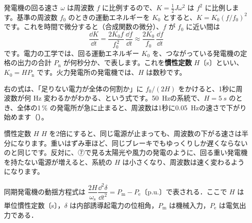 発電機の回る速さ $\omega$ は周波数 $f$ に比例するので、$K=\tfrac12J\omega^2$ は $f^2$ に比例します。基準の周波数 $f_0$ のときの運動エネルギーを $K_0$ とすると、$K=K_0(f/f_0)^2$ です。これを時間で微分すると（合成関数の微分）、$f$ が $f_0$ に近い間は
\[\frac{\dd K}{\dd t}=\frac{2K_0f}{f_0^{\,2}}\,\frac{\dd f}{\dd t}\approx\frac{2K_0}{f_0}\,\frac{\dd f}{\dd t}\]
です。電力の工学では、回る運動エネルギー $K_0$ を、つながっている発電機の定格の出力の合計 $P_{\mathrm n}$ が何秒分か、で表します。これを\textbf{慣性定数} $H$〔s〕といい、$K_0=HP_{\mathrm n}$ です。火力発電所の発電機では、$H$ は数秒です。
\begin{phflow}[周波数の下がる速さ]
\end{phflow}
右の式は、「足りない電力が全体の何割か」に $f_0/(2H)$ をかけると、1秒に周波数が何 Hz 変わるかがわかる、という式です。\qty{50}{Hz}の系統で、$H=\qty{5}{s}$ のとき、全体の1\,\% の発電所が急に止まると、周波数は1秒に\qty{0.05}{Hz}の速さで下がり始めます（）。
\begin{phbaisuru}{慣性定数 $H$}
$H$ を2倍にすると、同じ電源が止まっても、周波数の下がる速さは半分になります。重いはずみ車ほど、同じブレーキでもゆっくりしか遅くならないのと同じです。反対に、⑦で見る太陽光や風力の発電のように、回る重い発電機を持たない電源が増えると、系統の $H$ は小さくなり、周波数は速く変わるようになります。
\end{phbaisuru}

\begin{senmonsho}[電力系統工学の本の書き方]
\begin{bkhonbun}
同期発電機の動揺方程式は $\dfrac{2H}{\omega_{\mathrm s}}\dfrac{\dd^2\delta}{\dd t^2}=P_{\mathrm m}-P_{\mathrm e}$〔p.u.〕で表される．ここで $H$ は単位慣性定数〔s〕，$\delta$ は内部誘導起電力の位相角，$P_{\mathrm m}$ は機械入力，$P_{\mathrm e}$ は電気出力である．
\end{bkhonbun}
\end{senmonsho}


